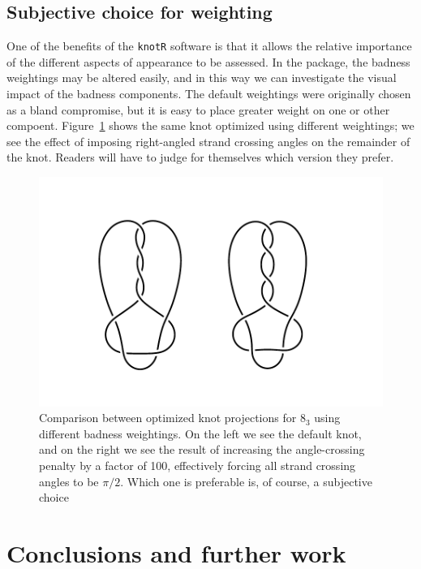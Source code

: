 \documentclass{birkjour}
\theoremstyle{definition}
\theoremstyle{remark}
\numberwithin{equation}{section}
\begin{document}
\subsection{Subjective \label{section_cca} choice for weighting}


One of the benefits of the {\tt knotR} software is that it allows the
relative importance of the different aspects of appearance to be
assessed.  In the package, the badness weightings may be altered
easily, and in this way we can investigate the visual impact of the
badness components.  The default weightings were originally chosen as
a bland compromise, but it is easy to place greater weight on one or
other compoent.  Figure~\ref{figure_cca} shows the same knot optimized
using different weightings; we see the effect of imposing right-angled
strand crossing angles on the remainder of the knot.  Readers will
have to judge for themselves which version they prefer.

\begin{figure}[htbp]
  \begin{center}
\includegraphics[width=13cm]{compare_crossing_angles}  %
\caption{Comparison between optimized knot projections for $8_3$
  \label{figure_cca} using different  badness weightings.  On the
  left we see the default knot, and on the right we see the result of
  increasing the angle-crossing penalty by a factor of 100,
  effectively forcing all strand crossing angles to be $\pi/2$.  Which
  one is preferable is, of course, a subjective choice}
  \end{center}
\end{figure}


\section{Conclusions and further work}
\end{document}
